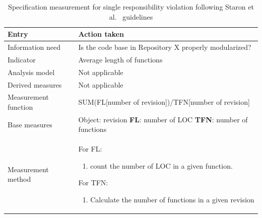     \begin{table}[!htb]
		\centering
		\tabulinesep=1.2mm
        \begin{tabu} to \textwidth {|X|X[2]|}

			\hline
			\textbf{Entry} & \textbf{Action taken} \\
			\hline

			Information need & Is the code base in Repository X properly modularized? \\
			\hline

			Indicator & Average length of functions \\
			\hline

			Analysis model & Not applicable \\
			\hline

			Derived measures & Not applicable \\
			\hline

			Measurement function & SUM(FL[number of revision])/TFN[number of revision] \\
			\hline

			Base measures & Object: revision \newline
			                    \textbf{FL}: number of LOC \newline
			                    \textbf{TFN}: number of functions \\
		    \hline

			Measurement method & For FL:
			    \begin{enumerate}
			    \item count the number of LOC in a given function.
			    \end{enumerate}

			For TFN:
			\begin{enumerate}
			\item Calculate the number of functions in a given revision
			\end{enumerate}

			\\
			\hline


		\end{tabu}
		\caption[Specification measurement for single responsibility violation]
        {Specification measurement for single responsibility violation following Staron et al.\ \cite{metrics_paper} guidelines}
        \label{tab:length_measurement_system}
    \end{table}

\FloatBarrier

